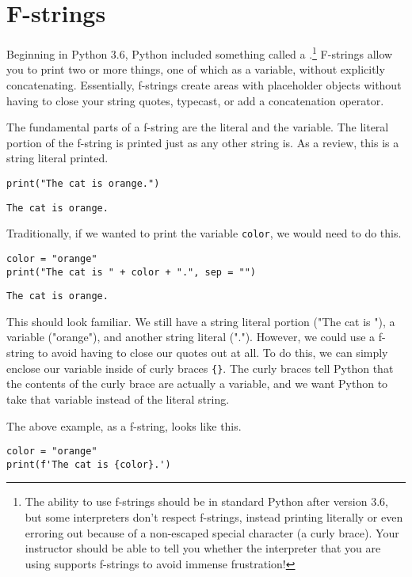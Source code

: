 \section{F-strings}
Beginning in Python 3.6, Python included something called a .\footnote{The ability to use f-strings should be in standard Python after version 3.6, but some interpreters don't respect f-strings, instead printing literally or even erroring out because of a non-escaped special character (a curly brace). Your instructor should be able to tell you whether the interpreter that you are using supports f-strings to avoid immense frustration!} F-strings allow you to print two or more things, one of which as a variable, without explicitly concatenating. Essentially, f-strings create areas with placeholder objects without having to close your string quotes, typecast, or add a concatenation operator.\par
The fundamental parts of a f-string are the literal and the variable. The literal portion of the f-string is printed just as any other string is. As a review, this is a string literal printed.
\begin{lstlisting}[style=pippython]
print("The cat is orange.")
\end{lstlisting}
\begin{lstlisting}[style=none]
The cat is orange.
\end{lstlisting}
Traditionally, if we wanted to print the variable \verb|color|, we would need to do this.
\begin{lstlisting}[style=pippython]
color = "orange"
print("The cat is " + color + ".", sep = "")
\end{lstlisting}
\begin{lstlisting}
The cat is orange.
\end{lstlisting}
This should look familiar. We still have a string literal portion ("The cat is "), a variable ("orange"), and another string literal ("."). However, we could use a f-string to avoid having to close our quotes out at all. To do this, we can simply enclose our variable inside of curly braces \verb|{}|. The curly braces tell Python that the contents of the curly brace are actually a variable, and we want Python to take that variable instead of the literal string.\par
The above example, as a f-string, looks like this.
\begin{lstlisting}[style=pippython]
color = "orange"
print(f'The cat is {color}.')
\end{lstlisting}
